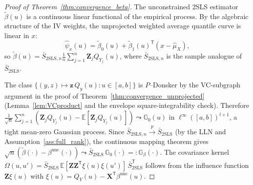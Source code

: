 \documentclass[12pt]{article}
\newcommand{\E}{\mathbb{E}}
\newcommand{\T}{\mathsf{T}} %
\begin{document}
\begin{proof}[Proof of Theorem~\ref{thm:convergence_beta}]
The unconstrained 2SLS estimator $\tilde{\beta}(u)$ is a continuous linear functional of the empirical process. By the algebraic structure of the IV weights, the unprojected weighted average quantile curve is linear in $x$:
\begin{equation}\label{eq:psi_linear}
\hat{\psi}_x(u) = \tilde{\beta}_0(u) + \tilde{\beta}_1(u)^{\T}(x - \hat{\mu}_X),
\end{equation}
so $\tilde{\beta}(u) = \bar{S}_{\mathrm{2SLS},n} \frac{1}{n}\sum_{j=1}^n \mathbf{Z}_j Q_{Y_j}(u)$, where $\bar{S}_{\mathrm{2SLS},n}$ is the sample analogue of $\bar{S}_{\mathrm{2SLS}}$.

The class $\{(y,z) \mapsto \mathbf{z}\, Q_y(u) : u \in [a,b]\}$ is $P$--Donsker by the VC-subgraph argument in the proof of Theorem~\ref{thm:convergence_unprojected} (Lemma~\ref{lem:VCproduct} and the envelope square-integrability check). Therefore $\frac{1}{\sqrt{n}}\sum_{j=1}^n (\mathbf{Z}_j Q_{Y_j}(u) - \E[\mathbf{Z}_j Q_{Y_j}(u)]) \leadsto \mathbb{G}_0(u)$ in $\ell^\infty([a,b])^{l+1}$, a tight mean-zero Gaussian process. Since $\bar{S}_{\mathrm{2SLS},n} \overset{p}{\to} \bar{S}_{\mathrm{2SLS}}$ (by the LLN and Assumption~\ref{ass:full_rank}), the continuous mapping theorem gives $\sqrt{n}(\tilde{\beta}(\cdot) - \beta^{\text{unc}}(\cdot)) \leadsto \bar{S}_{\mathrm{2SLS}}\, \mathbb{G}_0(\cdot) =: \mathbb{G}_\beta(\cdot)$. The covariance kernel $\Omega(u,u') = \bar{S}_{\mathrm{2SLS}}\, \E[\mathbf{Z}\mathbf{Z}^{\T}\xi(u)\xi(u')]\, \bar{S}_{\mathrm{2SLS}}^{\T}$ follows from the influence function $\mathbf{Z}\xi(u)$ with $\xi(u) = Q_Y(u) - \mathbf{X}^{\T}\beta^{\text{unc}}(u)$.
\end{proof}
\end{document}
